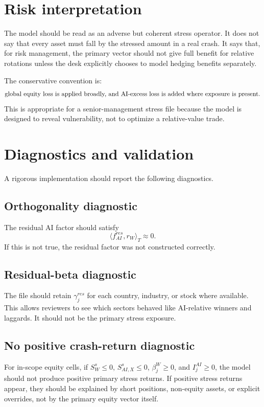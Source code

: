 \documentclass[11pt]{article}
\begin{document}
\section{Risk interpretation}

The model should be read as an adverse but coherent stress operator. It does not say that every asset must fall by the stressed amount in a real crash. It says that, for risk management, the primary vector should not give full benefit for relative rotations unless the desk explicitly chooses to model hedging benefits separately.

The conservative convention is:
\[
\hbox{global equity loss is applied broadly, and AI-excess loss is added where exposure is present.}
\]
This is appropriate for a senior-management stress file because the model is designed to reveal vulnerability, not to optimize a relative-value trade.

\section{Diagnostics and validation}

A rigorous implementation should report the following diagnostics.

\subsection{Orthogonality diagnostic}

The residual AI factor should satisfy
\[
\langle f_{AI}^{res},r_W\rangle_T\approx 0.
\]
If this is not true, the residual factor was not constructed correctly.

\subsection{Residual-beta diagnostic}

The file should retain $\gamma_j^{res}$ for each country, industry, or stock where available. This allows reviewers to see which sectors behaved like AI-relative winners and laggards. It should not be the primary stress exposure.

\subsection{No positive crash-return diagnostic}

For in-scope equity cells, if $S_W^s\leq 0$, $S_{AI,X}^s\leq 0$, $\beta_j^W\geq 0$, and $I_j^{AI}\geq 0$, the model should not produce positive primary stress returns. If positive stress returns appear, they should be explained by short positions, non-equity assets, or explicit overrides, not by the primary equity vector itself.
\end{document}
